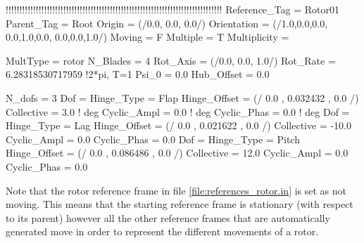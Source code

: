 \begin{inputfile}[frame=single, caption={references\_rotor.in}, label={file:references_rotor.in}]
!!!!!!!!!!!!!!!!!!!!!!!!!!!!!!!!!!!!!!!!!!!!!!!!!!!!!!!!!!!!!!!!!!!!!!!!!!!!!!!
Reference_Tag = Rotor01
Parent_Tag = Root
Origin = (/0.0, 0.0, 0.0/)
Orientation = (/1.0,0.0,0.0, 0.0,1.0,0.0, 0.0,0.0,1.0/)
Moving = F
Multiple = T
Multiplicity = {
  MultType = rotor
  N_Blades = 4
  Rot_Axis = (/0.0, 0.0, 1.0/)
  Rot_Rate = 6.28318530717959 !2*pi, T=1
  Psi_0 = 0.0
  Hub_Offset = 0.0

  N_dofs = 3
  Dof = {
    Hinge_Type = Flap
    Hinge_Offset = (/ 0.0 , 0.032432 , 0.0 /)
    Collective  =  3.0     ! deg
    Cyclic_Ampl =  0.0     ! deg
    Cyclic_Phas =  0.0     ! deg
  }
  Dof = {
    Hinge_Type = Lag
    Hinge_Offset = (/ 0.0 , 0.021622 , 0.0 /)
    Collective  = -10.0
    Cyclic_Ampl =  0.0
    Cyclic_Phas =  0.0
  }
  Dof = {
    Hinge_Type = Pitch
    Hinge_Offset = (/ 0.0 , 0.086486 , 0.0 /)
    Collective  = 12.0
    Cyclic_Ampl =  0.0
    Cyclic_Phas =  0.0
  }

}


\end{inputfile}
 Note that the rotor reference frame in file \ref{file:references_rotor.in} is set as not moving. This means that the starting reference frame is stationary (with respect to its parent) however all the other reference frames that are automatically generated move in order to represent the different movements of a rotor.
 
